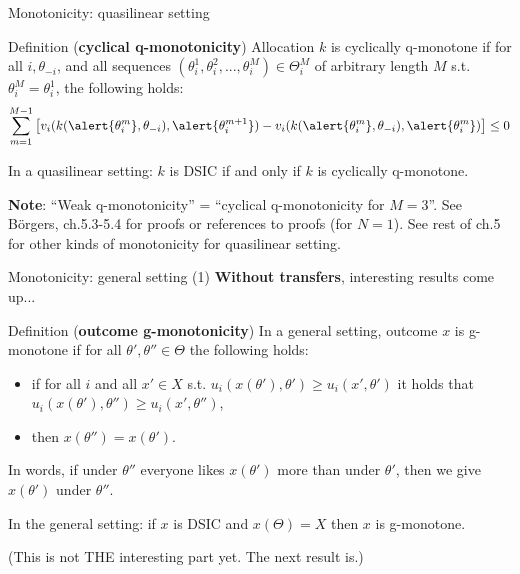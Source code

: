 \documentclass[english,10pt
,aspectratio=169
]{beamer}
\begin{document}
\begin{frame}{Monotonicity: quasilinear setting}
	\begin{exampleblock}{Definition (\textbf{cyclical q-monotonicity})}
		Allocation $k$ is \alert{cyclically q-monotone} if for all $i,\theta_{-i}$, and all sequences $(\theta_i^1,\theta_i^2,...,\theta_i^M)\in \Theta_i^M$ of arbitrary length $M$ s.t. $\theta_i^M=\theta_i^1$, the following holds:
		\begin{equation*}
			\sum_{m=1}^{M-1}
			\left[
			v_{i}(k(\alert{\theta_{i}^m}, \theta_{-i}), \alert{\theta_{i}^{m+1}}) - 
			v_{i}(k(\alert{\theta_{i}^{m}}, \theta_{-i}), \alert{\theta_{i}^m}) 
			\right] 
			\leq 0
		\end{equation*}
	\end{exampleblock}
	\begin{theorem}
		In a quasilinear setting: $k$ is DSIC if and only if $k$ is cyclically q-monotone.
	\end{theorem}
	\textbf{Note}: ``Weak q-monotonicity'' = ``cyclical q-monotonicity for $M=3$''.
	See B{\"o}rgers, ch.5.3-5.4 for proofs or references to proofs (for $N=1$). See rest of ch.5 for other kinds of monotonicity for quasilinear setting.
\end{frame}


\begin{frame}{Monotonicity: general setting (1)}
	\textbf{Without transfers}, interesting results come up... 
	\begin{exampleblock}{Definition (\textbf{outcome g-monotonicity})}
		In a general setting, outcome $x$ is \alert{g-monotone} if for all $\theta',\theta'' \in \Theta$ the following holds:
		\begin{itemize}
			\item if for all $i$ and all $x' \in X$ s.t. $u_i(x(\theta'),\theta') \geq u_i(x',\theta')$ it holds that $u_i(x(\theta'),\theta'') \geq u_i(x',\theta'')$,
			\item then $x(\theta'')=x(\theta')$.
		\end{itemize}
	\end{exampleblock}
	In words, if under $\theta''$ everyone likes $x(\theta')$ more than under $\theta'$, then we give $x(\theta')$ under $\theta''$.
	\begin{theorem}
		In the general setting: if $x$ is DSIC and $x(\Theta)=X$ then $x$ is g-monotone.
	\end{theorem}
	(This is not THE interesting part yet. The next result is.)
\end{frame}
\end{document}
